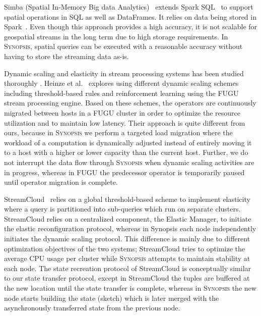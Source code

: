 Simba (Spatial In-Memory Big data Analytics)~\cite{xiesimba} extends Spark SQL~\cite{armbrust2015spark} to support spatial operations in SQL as well as DataFrames. It relies on data being stored in Spark~\cite{zaharia2010spark}. Even though this approach provides a high accuracy, it is not scalable for geospatial streams in the long term due to high storage requirements. In \textsc{Synopsis}, spatial queries can be executed with a reasonable accuracy without having to store the streaming data as-is.

Dynamic scaling and elasticity in stream processing systems has been studied thoroughly \cite{heinze2014auto, gulisano2012streamcloud, castro2013integrating, loesing2012stormy, heinze2013elastic, schneider2009elastic}.
Heinze et al.~\cite{heinze2014auto} explores using different dynamic scaling schemes including threshold-based rules and reinforcement learning using the FUGU~\cite{heinze2013elastic} stream processing engine.
Based on these schemes, the operators are continuously migrated between hosts in a FUGU cluster in order to optimize the resource utilization and to maintain low latency.
Their approach is quite different from ours, because in \textsc{Synopsis} we perform a targeted load migration where the workload of a computation is dynamically adjusted instead of entirely moving it to a host with a higher or lower capacity than the current host.
Further, we do not interrupt the data flow through \textsc{Synopsis} when dynamic scaling activities are in progress, whereas in FUGU the predecessor operator is temporarily paused until operator migration is complete. 

StreamCloud~\cite{gulisano2012streamcloud} relies on a global threshold-based scheme to implement elasticity where a query is partitioned into sub-queries which run on separate clusters.
StreamCloud relies on a centralized component, the Elastic Manager, to initiate the elastic reconfiguration protocol, whereas in Synopsis each node independently initiates the dynamic scaling protocol.
This difference is mainly due to different optimization objectives of the two systems; StreamCloud tries to optimize the average CPU usage per cluster while \textsc{Synopsis} attempts to maintain stability at each node.
The state recreation protocol of StreamCloud is conceptually similar to our state transfer protocol, except in StreamCloud the tuples are buffered at the new location until the state transfer is complete, whereas in \textsc{Synopsis} the new node starts building the state (sketch) which is later merged with the asynchronously transferred state from the previous node.

